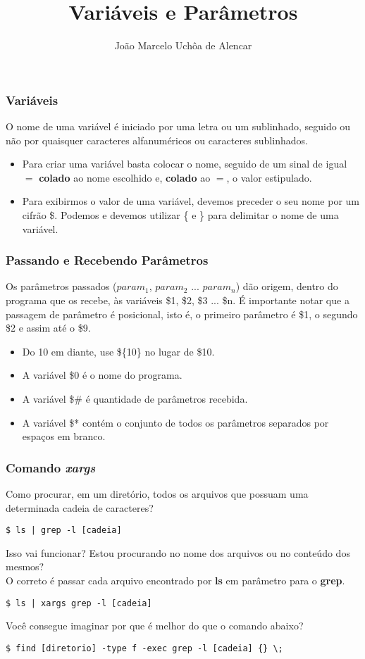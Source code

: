 \documentclass{beamer}
\title{Variáveis e Parâmetros}
\author[João Marcelo Uchôa de Alencar]{João Marcelo Uchôa de Alencar}
\institute{Universidade Federal do Ceará - Quixadá}
\begin{document}
   \begin{frame}
      \titlepage
   \end{frame}

   \begin{frame}
      \frametitle{Variáveis}
      O nome de uma variável é iniciado por uma letra ou um sublinhado, seguido ou não por quaisquer caracteres alfanuméricos ou caracteres sublinhados.
      \begin{itemize}
         \item Para criar uma variável basta colocar o nome, seguido de um sinal de igual $=$ \textbf{colado} ao nome escolhido e, \textbf{colado} ao $=$, o valor estipulado.
	      \item Para exibirmos o valor de uma variável, devemos preceder o seu nome por um cifrão \$. Podemos e devemos utilizar \{ e \} para delimitar o nome de uma variável.
      \end{itemize}
   \end{frame}

   \begin{frame}
      \frametitle{Passando e Recebendo Parâmetros}
      Os parâmetros passados ($param_ {1}$, $param_ {2}$ ... $param_ {n}$) dão origem, dentro do programa que os recebe, às variáveis \$1, \$2, \$3 ... \$n. É importante notar que a passagem de parâmetro é posicional, isto é, o primeiro parâmetro é \$1, o segundo \$2 e assim até o \$9.
      \begin{itemize}
         \item Do 10 em diante, use \$\{10\} no lugar de \$10.
	      \item A variável \$0 é o nome do programa.
	      \item A variável \$\# é quantidade de parâmetros recebida.
	      \item A variável \$* contém o conjunto de todos os parâmetros separados por espaços em branco.
      \end{itemize}
   \end{frame}

\begin{frame}[fragile]
   \frametitle{Comando \textit{xargs}}
   Como procurar, em um diretório, todos os arquivos que possuam uma determinada cadeia de caracteres? 
   \begin{verbatim}
$ ls | grep -l [cadeia] 
   \end{verbatim}
   Isso vai funcionar? Estou procurando no nome dos arquivos ou no conteúdo dos mesmos? \\
   O correto é passar cada arquivo encontrado por \textbf{ls} em parâmetro para o \textbf{grep}. 
   \begin{verbatim}
$ ls | xargs grep -l [cadeia] 
   \end{verbatim}
   Você consegue imaginar por que é melhor do que o comando abaixo? 
   \begin{verbatim}
$ find [diretorio] -type f -exec grep -l [cadeia] {} \;
   \end{verbatim}
\end{frame}
\end{document}
